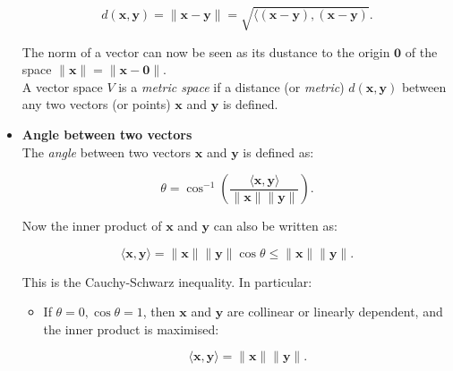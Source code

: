 \documentclass[10pt,b5paper,titlepage]{book}
\begin{document}
\begin{itemize}
        \begin{equation}
            d(\mathbf{x}, \mathbf{y}) = \|\mathbf{x} - \mathbf{y}\|
            = \sqrt{\langle (\mathbf{x} - \mathbf{y}), (\mathbf{x} - \mathbf{y})}
        .\end{equation}

        The norm of a vector can now be seen as its dustance to the origin
        $\mathbf{0}$ of the space $\|\mathbf{x}\| = \|\mathbf{x} - \mathbf{0}\|$.\\

        A vector space $V$ is a \textit{metric space} if a distance
        (or \textit{metric}) $d(\mathbf{x}, \mathbf{y})$ between any two
        vectors (or points) $\mathbf{x}$ and $\mathbf{y}$ is defined.

    \item \textbf{Angle between two vectors}\\

        The \textit{angle} between two vectors $\mathbf{x}$ and $\mathbf{y}$
        is defined as:

        \begin{equation}
            \theta = \cos^{-1} \left( \frac{\langle \mathbf{x}, \mathbf{y} \rangle}{\|\mathbf{x}\| \|\mathbf{y}\|} \right)
        .\end{equation}

        Now the inner product of $\mathbf{x}$ and $\mathbf{y}$
        can also be written as:

        \begin{equation}
            \langle \mathbf{x}, \mathbf{y} \rangle
            = \|\mathbf{x}\| \|\mathbf{y}\| \cos \theta
            \le \|\mathbf{x}\| \|\mathbf{y}\|
        .\end{equation}

        This is the Cauchy-Schwarz inequality. In particular:

        \begin{itemize}
            \item If $\theta = 0, \cos \theta = 1$, then
                $\mathbf{x}$ and $\mathbf{y}$ are collinear or linearly
                dependent, and the inner product is maximised:

                \begin{equation}
                    \langle \mathbf{x}, \mathbf{y} \rangle
                    = \|\mathbf{x}\| \|\mathbf{y}\|
                .\end{equation}


\end{itemize}
\end{itemize}
\end{document}

